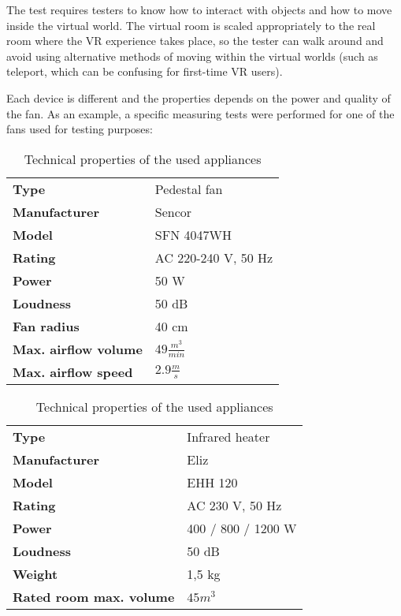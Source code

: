 The test requires testers to know how to interact with objects and how to move
inside the virtual world. The virtual room is scaled appropriately to the
real room where the VR experience takes place, so the tester can walk around
and avoid using alternative methods of moving within the virtual worlds
(such as teleport, which can be confusing for first-time VR users).


Each device is different and the properties depends on the power and quality of the fan.
As an example, a specific measuring tests were performed for one of the fans
used for testing purposes:

\begin{table}
    \centering
    \begin{tabular}{|p{}|p{}|}
        \hline
        \textbf{Type} & Pedestal fan \\ 
        \textbf{Manufacturer} & Sencor \\ 
        \textbf{Model} & SFN 4047WH \\ 
        \textbf{Rating} & AC 220-240 V, 50 Hz \\ 
        \textbf{Power} & 50 W \\ 
        \textbf{Loudness} & 50 dB \\ 
        \textbf{Fan radius} & 40 cm \\ 
        \textbf{Max. \mbox{airflow} volume} & $ 49 \frac{m^3}{min} $ \\ 
        \textbf{Max. \mbox{airflow} speed} & $ 2.9 \frac{m}{s} $ \\ 
        \hline
    \end{tabular}
    \quad
    \begin{tabular}{|p{}|p{}|}
        \hline
        \textbf{Type} & Infrared heater \\ 
        \textbf{Manufacturer} & Eliz \\
        \textbf{Model} & EHH 120 \\ 
        \textbf{Rating }& AC 230 V, 50 Hz \\ 
        \textbf{Power} & 400 / 800 / 1200 W \\ 
        \textbf{Loudness} & 50 dB \\ 
        \textbf{Weight} & 1,5 kg \\ 
        \textbf{Rated room max. volume} & $ 45 m^3 $ \\ 
        \hline
    \end{tabular}
    \caption{Technical properties of the used appliances}
    \label{}
\end{table}

